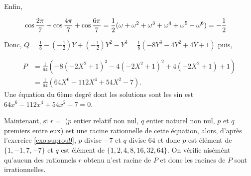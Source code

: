 {{Enfin,

\begin{align*}\ensuremath
\cos\frac{2\pi}{7}+\cos\frac{4\pi}{7}+\cos\frac{6\pi}{7}&=\frac{1}{2}(\omega+\omega^2+\omega^3+\omega^4+\omega^5+\omega^6)=-\frac{1}{2}
\end{align*}

Donc, $Q=\frac{1}{8}-(-\frac{1}{2})Y+(-\frac{1}{2})Y^2-Y^3=\frac{1}{8}(-8Y^3-4Y^2+4Y+1)$ puis,
 
\begin{align*}
P &= \frac{1}{64}(-8(-2X^2+1)^3-4(-2X^2+1)^2+4(-2X^2+1)+1) \\
&= \frac{1}{64}(64X^6-112X^4+54X^2-7).
\end{align*}
Une équation du $6$ème degré dont les solutions sont les sin est $64x^6-112x^4+54x^2-7=0$.

Maintenant, si $r=$ ($p$ entier relatif non nul, $q$ entier naturel  non nul, $p$ et $q$ premiers entre eux) est une racine rationnelle de cette équation, alors, d'après l'exercice \ref{exo:suprou9}, $p$ divise $-7$ et $q$ divise $64$ et donc 
$p$ est élément de $\{1,-1,7,-7\}$ et $q$ est élément de $\{1,2,4,8,16,32,64\}$. On vérifie aisémént qu'aucun des rationnels $r$ obtenu n'est racine de $P$ et donc les racines de $P$ sont irrationnelles.
}
}

